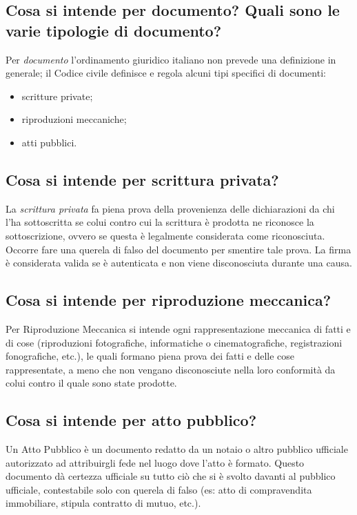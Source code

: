 \subsection{Cosa si intende per documento? Quali sono le varie tipologie di documento?}
Per \textit{documento} l’ordinamento giuridico italiano non prevede una definizione in generale;
il Codice civile definisce e regola alcuni tipi specifici di documenti:
\begin{itemize}
    \item scritture private;
    \item riproduzioni meccaniche;
    \item atti pubblici.
\end{itemize}
\subsection{Cosa si intende per scrittura privata?}
La \textit{scrittura privata} fa piena prova della provenienza delle dichiarazioni da chi l’ha
sottoscritta se colui contro cui la scrittura è prodotta ne riconosce la sottoscrizione,
ovvero se questa è legalmente considerata come riconosciuta.
\newline Occorre fare una querela di falso del documento per smentire tale prova.
\newline La firma è considerata valida se è autenticata e non viene disconosciuta durante una causa.
\subsection{Cosa si intende per riproduzione meccanica?}
Per Riproduzione Meccanica si intende ogni rappresentazione meccanica di fatti e di cose
(riproduzioni fotografiche, informatiche o cinematografiche, registrazioni fonografiche, etc.),
le quali formano piena prova dei fatti e delle cose rappresentate, a meno che non vengano disconosciute
nella loro conformità da colui contro il quale sono state prodotte.
\subsection{Cosa si intende per atto pubblico?}
Un Atto Pubblico è un documento redatto da un notaio o altro pubblico ufficiale autorizzato
ad attribuirgli fede nel luogo dove l’atto è formato.
Questo documento dà certezza ufficiale su tutto ciò che si è svolto davanti al pubblico ufficiale,
contestabile solo con querela di falso (es: atto di compravendita immobiliare, stipula contratto di mutuo, etc.).
